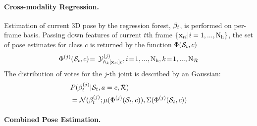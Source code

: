 \paragraph{Cross-modality Regression.}
\label{sec:jrftest}
Estimation of current 3D pose by the regression forest, $\mathbf{\beta}_{t}$, is performed on per-frame basis. 
Passing down features of current $t$th frame $\{\mathbf{x}_{ti}|i = 1,...,\mathrm{N_{h}}\}$, the set of pose estimates for class $c$ is returned by the function $\Phi(\mathcal{S}_{t}, c)$
\begin{equation}
	\label{eq:regressset}
	\Phi^{(j)}(\mathcal{S}_{t}, c)\!=\!\ \mathcal{Y}^{(j)}_{{\hat{n}}_{k}[\mathbf{x}_{ti}]c},  i\!=\!1,...,\mathrm{N_{h}},k\!=\!1,...,\mathrm{N_{\mathcal{R}}}
\end{equation} 
The distribution of votes for the $j$-th joint is described by an Gaussian: 
\begin{equation}
	\begin{split}
		& P( \mathbf{\beta}_{t}^{(j)}| \mathcal{S}_{t}, a = c, \mathcal{R})\\ 
		& = \mathcal{N}(\mathbf{\beta}_{t}^{(j)};\mu(\Phi^{(j)}(\mathcal{S}_{t}, c)),\Sigma(\Phi^{(j)}(\mathcal{S}_{t},c))
\end{split}
\end{equation}




\paragraph{Combined Pose Estimation.}

